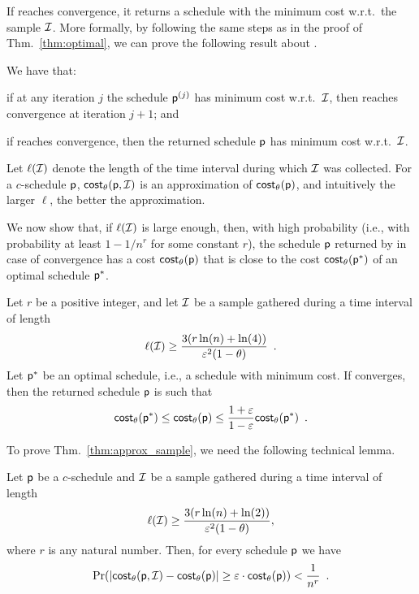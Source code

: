 If \algonameapx reaches convergence, it returns a schedule with the minimum cost
w.r.t.~the sample $\mathcal{I}$. More formally, by following the same steps as in
the proof of Thm.~\ref{thm:optimal}, we can prove the following result about
\algonameapx.

\begin{lemma}\label{lem:optimal_sample}
	We have that:
	\begin{enumerate*}
		\item if at any iteration $j$ the schedule $\mathsf{p}^{(j)}$ has minimum
			cost w.r.t.~$\mathcal{I}$, then \algonameapx reaches convergence at
			iteration $j+1$; and
		\item if \algonameapx reaches convergence, then the returned schedule
			$\mathsf{p}$ has minimum cost w.r.t.~$\mathcal{I}$.
	\end{enumerate*}
\end{lemma}

Let $\ell(\mathcal{I})$ denote the length of the time interval during which
$\mathcal{I}$ was collected. For a $c$-schedule $\mathsf{p}$,
$\mathsf{cost}_\theta(\mathsf{p},\mathcal{I})$ is an approximation of $\mathsf{cost}_\theta(\mathsf{p})$,
and intuitively the larger $\ell$, the better the approximation.

We now show that, if $\ell(\mathcal{I})$ is large enough, then, with high
probability (i.e., with probability at least $1-1/n^r$ for some constant $r$),
the schedule $\mathsf{p}$ returned by \algonameapx in case of convergence has a cost
$\mathsf{cost}_\theta(\mathsf{p})$ that is close to the cost $\mathsf{cost}_\theta(\mathsf{p}^*)$ of an optimal
schedule $\mathsf{p}^*$.

\begin{theorem}\label{thm:approx_sample}
	Let $r$ be a positive integer, and let $\mathcal{I}$ be a sample gathered during a
	time interval of length
	\begin{equation}\label{eq:samplesize}
		\ell(\mathcal{I}) \geq
		\frac{3(r\ln(n)+\ln(4))}{\varepsilon^2(1-\theta)}\enspace.
	\end{equation}
	Let $\mathsf{p}^*$ be an optimal schedule, i.e., a schedule with minimum cost. If \algonameapx converges, then the returned schedule
	$\mathsf{p}$ is such that
	\[
		\mathsf{cost}_\theta(\mathsf{p}^*)\le\mathsf{cost}_\theta(\mathsf{p})\le\frac{1+\varepsilon}{1-\varepsilon}\mathsf{cost}_\theta(\mathsf{p}^*)\enspace.
	\]
\end{theorem}

To prove Thm.~\ref{thm:approx_sample}, we need the following technical lemma.

\begin{lemma}\label{lem:chernoffcost}
	Let $\mathsf{p}$ be a $c$-schedule and $\mathcal{I}$ be a sample gathered during a
	time interval of length
	\begin{align}\label{eq:samp_cond}
		\ell(\mathcal{I}) \geq \frac{3(r\ln(n)+\ln(2))}{\varepsilon^2(1-\theta)},
	\end{align}
	where $r$ is any natural number. Then, for every schedule $\mathsf{p}$ we have
	\[
		\Pr(|\mathsf{cost}_\theta(\mathsf{p},\mathcal{I}) - \mathsf{cost}_\theta(\mathsf{p})|\geq
		\varepsilon\cdot\mathsf{cost}_\theta(\mathsf{p})) < \frac{1}{n^r}\enspace .
	\]
\end{lemma}

